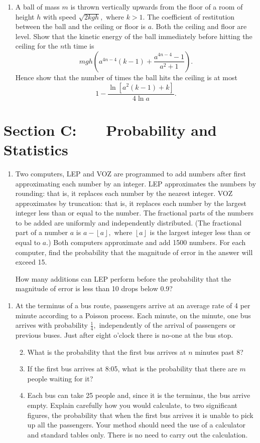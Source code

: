 \documentclass[a4, 11pt]{report}
\newlength{\qspace}
\newcounter{qnumber}
\newenvironment{question}%
 {\vspace{\qspace}
  \begin{enumerate}[\bfseries 1\quad][10]%
    \setcounter{enumi}{\value{qnumber}}%
    \item%
 }
{
  \end{enumerate}
  \filbreak
  \stepcounter{qnumber}
 }
\newenvironment{questionparts}[1][1]%
 {
  \begin{enumerate}[\bfseries (i)]%
    \setcounter{enumii}{#1}
    \addtocounter{enumii}{-1}
    \setlength{\itemsep}{5mm}
    \setlength{\parskip}{8pt}
 }
 {
  \end{enumerate}
 }
\begin{document}
\begin{question}
A ball of mass $m$ is thrown vertically upwards from the floor of
a room of height $h$ with speed $\sqrt{2kgh},$ where $k>1.$ The
coefficient of restitution between the ball and the ceiling or floor
is $a$. Both the ceiling and floor are level. Show that the kinetic
energy of the ball immediately before hitting the ceiling for the
$n$th time is 
\[
mgh\left(a^{4n-4}(k-1)+\frac{a^{4n-4}-1}{a^{2}+1}\right).
\]
Hence show that the number of times the ball hits the ceiling is at
most 
\[
1-\frac{\ln[a^{2}(k-1)+k]}{4\ln a}.
\]
\end{question}
	
	\newpage
\section*{Section C: \ \ \ Probability and Statistics}


\begin{question}
Two computers, LEP and VOZ are programmed to add numbers after first
approximating each number by an integer. LEP approximates the numbers
by rounding: that is, it replaces each number by the nearest integer.
VOZ approximates by truncation: that is, it replaces each number by
the largest integer less than or equal to the number. The fractional
parts of the numbers to be added are uniformly and independently distributed.
(The fractional part of a number $a$ is $a-\left\lfloor a\right\rfloor ,$
where $\left\lfloor a\right\rfloor $ is the largest integer less
than or equal to $a$.) Both computers approximate and add 1500 numbers.
For each computer, find the probability that the magnitude of error
in the answer will exceed 15. 


How many additions can LEP perform before the probability that the
magnitude of error is less than 10 drops below 0.9? 
\end{question}

\begin{question}

At the terminus of a bus route, passengers arrive at an average rate
of 4 per minute according to a Poisson process. Each minute, on the
minute, one bus arrives with probability $\frac{1}{4},$ independently
of the arrival of passengers or previous buses. Just after eight o'clock
there is no-one at the bus stop. 

\begin{questionparts}
\item What is the probability that the first bus arrives at $n$ minutes
past 8?
\item If the first bus arrives at 8:05, what is the probability that there
are $m$ people waiting for it?
\item Each bus can take 25 people and, since it is the terminus, the bus
arrive empty. Explain carefully how you would calculate, to two significant
figures, the probability that when the first bus arrives it is unable
to pick up all the passengers. Your method should need the use of
a calculator and standard tables only. There is no need to carry out
the calculation. 
\end{questionparts}
\end{question}
\end{document}
